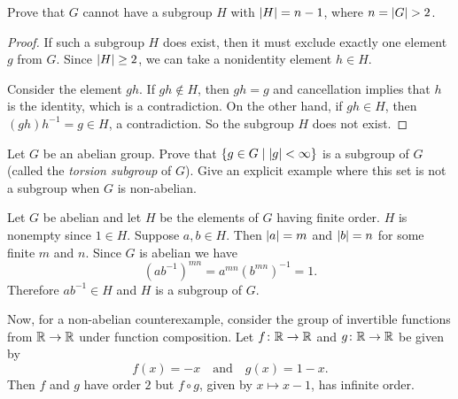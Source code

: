  Prove that $G$ cannot have a subgroup $H$ with
$\lvert{H}\rvert = n - 1$, where $n = \lvert{G}\rvert > 2$.
\begin{proof}
  If such a subgroup $H$ does exist, then it must exclude exactly one
  element $g$ from $G$. Since $\lvert{H}\rvert\geq2$, we can take a nonidentity
  element $h\in H$.

  Consider the element $gh$. If $gh\not\in H$, then $gh = g$ and
  cancellation implies that $h$ is the identity, which is a
  contradiction. On the other hand, if $gh\in H$, then
  $(gh)h^{-1} = g\in H$, a contradiction. So the subgroup $H$ does not
  exist.
\end{proof}

 Let $G$ be an abelian group. Prove that
$\{g\in G\mid\lvert{g}\rvert<\infty\}$ is a subgroup of $G$ (called the {\em
  torsion subgroup} of $G$). Give an explicit example where this set
is not a subgroup when $G$ is non-abelian.
\begin{solution}
  Let $G$ be abelian and let $H$ be the elements of $G$ having finite
  order. $H$ is nonempty since $1\in H$. Suppose $a,b\in H$. Then
  $\lvert{a}\rvert = m$ and $\lvert{b}\rvert = n$ for some finite $m$ and $n$. Since
  $G$ is abelian we have
  \begin{equation*}
    (ab^{-1})^{mn} = a^{mn}(b^{mn})^{-1} = 1.
  \end{equation*}
  Therefore $ab^{-1}\in H$ and $H$ is a subgroup of $G$.

  Now, for a non-abelian counterexample, consider the group of
  invertible functions from $\mathbb{R}\to\mathbb{R}$ under function composition. Let
  $f\colon\mathbb{R}\to\mathbb{R}$ and $g\colon\mathbb{R}\to\mathbb{R}$ be given by
  \begin{equation*}
    f(x) = -x
    \quad\text{and}\quad
    g(x) = 1 - x.
  \end{equation*}
  Then $f$ and $g$ have order $2$ but $f\circ g$, given by
  $x\mapsto x - 1$, has infinite order.
\end{solution}
